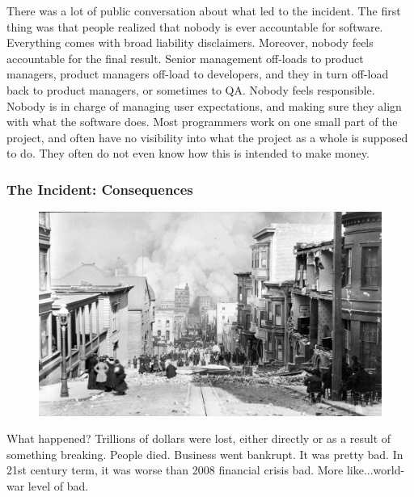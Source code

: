 There was a lot of public conversation about what led to the incident.
The first thing was that people realized that nobody is ever accountable
for software.
Everything comes with broad liability disclaimers.
Moreover,
nobody feels accountable for the final result.
Senior management off-loads to product managers,
product managers off-load to developers,
and they in turn off-load back to product managers,
or sometimes to QA.
Nobody feels responsible.
Nobody is in charge of managing user expectations,
and making sure they align with what the software does.
Most programmers work on one small part of the project,
and often have no visibility into what the project as a whole is supposed to do.
They often do not even know how this is intended to make money.

\begin{frame}[fragile]
\frametitle{The Incident: Consequences}

\begin{figure}
\includegraphics[scale=0.5]{fire}
\end{figure}

\end{frame}

What happened?
Trillions of dollars were lost,
either directly or as a result of 
something breaking.
People died.
Business went bankrupt.
It was pretty bad.
In 21st century term,
it was worse than 2008 financial crisis bad.
More like...world-war level of bad.

